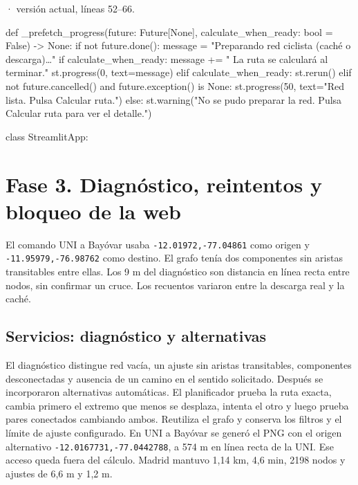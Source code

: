 \documentclass[11pt,a4paper]{article}
\begin{document}
\smallskip
{\footnotesize\texttt{} · versión actual, líneas 52--66.}\par
\begin{Codigo}[firstnumber=52]
def _prefetch_progress(future: Future[None], calculate_when_ready: bool = False) -> None:
    if not future.done():
        message = "Preparando red ciclista (caché o descarga)…"
        if calculate_when_ready:
            message += " La ruta se calculará al terminar."
        st.progress(0, text=message)
    elif calculate_when_ready:
        st.rerun()
    elif not future.cancelled() and future.exception() is None:
        st.progress(50, text="Red lista. Pulsa Calcular ruta.")
    else:
        st.warning("No se pudo preparar la red. Pulsa Calcular ruta para ver el detalle.")


class StreamlitApp:
\end{Codigo}

\section{Fase 3. Diagnóstico, reintentos y bloqueo de la web}
El comando UNI a Bayóvar usaba \texttt{-12.01972,-77.04861} como origen y \texttt{-11.95979,-76.98762} como destino. El grafo tenía dos componentes sin aristas transitables entre ellas. Los 9 m del diagnóstico son distancia en línea recta entre nodos, sin confirmar un cruce. Los recuentos variaron entre la descarga real y la caché.

\subsection{Servicios: diagnóstico y alternativas}
El diagnóstico distingue red vacía, un ajuste sin aristas transitables, componentes desconectadas y ausencia de un camino en el sentido solicitado. Después se incorporaron alternativas automáticas. El planificador prueba la ruta exacta, cambia primero el extremo que menos se desplaza, intenta el otro y luego prueba pares conectados cambiando ambos. Reutiliza el grafo y conserva los filtros y el límite de ajuste configurado. En UNI a Bayóvar se generó el PNG con el origen alternativo \texttt{-12.0167731,-77.0442788}, a 574 m en línea recta de la UNI. Ese acceso queda fuera del cálculo. Madrid mantuvo 1,14 km, 4,6 min, 2198 nodos y ajustes de 6,6 m y 1,2 m.
\end{document}
